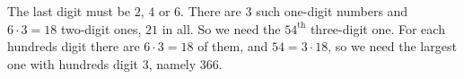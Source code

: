 The last digit must be $2$, $4$ or $6$. There are $3$ such one-digit numbers and $6\cdot3=18$ two-digit ones, $21$ in all. So we need the $54^{\text{th}}$ three-digit one. For each hundreds digit there are $6\cdot3=18$ of them, and $54=3\cdot18$, so we need the largest one with hundreds digit $3$, namely $\boxed{366}$.
